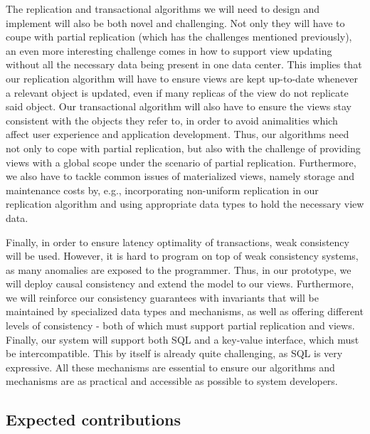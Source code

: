 The replication and transactional algorithms we will need to design and implement will also be both novel and challenging.
Not only they will have to coupe with partial replication (which has the challenges mentioned previously), an even more interesting challenge comes in how to support view updating without all the necessary data being present in one data center.
This implies that our replication algorithm will have to ensure views are kept up-to-date whenever a relevant object is updated, even if many replicas of the view do not replicate said object.
Our transactional algorithm will also have to ensure the views stay consistent with the objects they refer to, in order to avoid animalities which affect user experience and application development.
Thus, our algorithms need not only to cope with partial replication, but also with the challenge of providing views with a global scope under the scenario of partial replication.
Furthermore, we also have to tackle common issues of materialized views, namely storage and maintenance costs by, e.g., incorporating non-uniform replication in our replication algorithm and using appropriate data types to hold the necessary view data.

Finally, in order to ensure latency optimality of transactions, weak consistency will be used. %
However, it is hard to program on top of weak consistency systems, as many anomalies are exposed to the programmer. %
Thus, in our prototype, we will deploy causal consistency and extend the model to our views. %
Furthermore, we will reinforce our consistency guarantees with invariants that will be maintained by specialized data types and mechanisms, as well as offering different levels of consistency - both of which must support partial replication and views.
Finally, our system will support both SQL and a key-value interface, which must be intercompatible.
This by itself is already quite challenging, as SQL is very expressive. 
All these mechanisms are essential to ensure our algorithms and mechanisms are as  practical and accessible as possible to system developers.


\subsection{Expected contributions}


